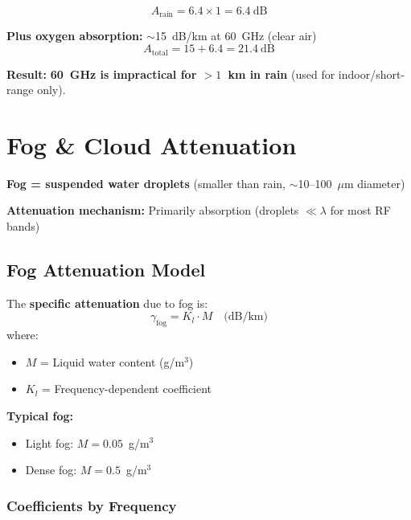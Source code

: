 \begin{equation}
A_{\text{rain}} = 6.4 \times 1 = 6.4~\text{dB}
\end{equation}

\textbf{Plus oxygen absorption:} $\sim$15~dB/km at 60~GHz (clear air)
\begin{equation}
A_{\text{total}} = 15 + 6.4 = 21.4~\text{dB}
\end{equation}

\textbf{Result:} \textbf{60~GHz is impractical for $>1$~km in rain} (used for indoor/short-range only).

\section{Fog \& Cloud Attenuation}

\textbf{Fog = suspended water droplets} (smaller than rain, $\sim$10--100~$\mu$m diameter)

\textbf{Attenuation mechanism:} Primarily absorption (droplets $\ll \lambda$ for most RF bands)

\subsection{Fog Attenuation Model}

The \textbf{specific attenuation} due to fog is:
\begin{equation}
\gamma_{\text{fog}} = K_l \cdot M \quad \text{(dB/km)}
\end{equation}
where:
\begin{itemize}
\item $M$ = Liquid water content (g/m$^3$)
\item $K_l$ = Frequency-dependent coefficient
\end{itemize}

\textbf{Typical fog:}
\begin{itemize}
\item Light fog: $M = 0.05$~g/m$^3$
\item Dense fog: $M = 0.5$~g/m$^3$
\end{itemize}

\subsubsection{Coefficients by Frequency}

